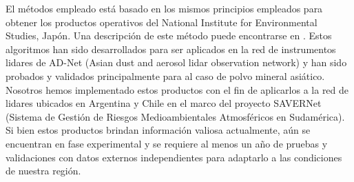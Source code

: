 \documentclass[12pt,a4paper,final]{report}
\begin{document}
	El métodos empleado está basado en los mismos principios empleados para obtener los productos operativos del National Institute for Environmental Studies, Japón. Una descripción de este método puede encontrarse en \citet{shimizu2017}. Estos algoritmos han sido desarrollados para ser aplicados en la red de instrumentos lidares de AD-Net (Asian dust and aerosol lidar observation network) y han sido probados y validados principalmente para al caso  de polvo mineral asiático. Nosotros hemos implementado estos productos con el fin de aplicarlos a la red de lidares ubicados en Argentina y Chile en el marco del proyecto SAVERNet (Sistema de Gestión de Riesgos Medioambientales Atmosféricos en Sudamérica). Si bien estos productos brindan información valiosa actualmente, aún se encuentran en fase experimental y se requiere al menos un año de pruebas y validaciones con datos externos independientes para adaptarlo a las condiciones de nuestra región.
	
\end{document}
